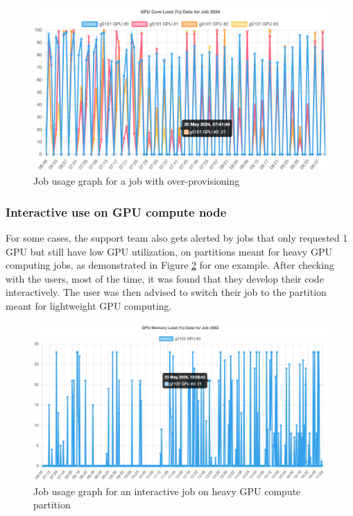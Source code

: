 \begin{figure}[H]
    \centering
    \includegraphics[width=1\textwidth]{figures/job-over-provison.png}
    \caption{Job usage graph for a job with over-provisioning}
    \label{fig_job_over_provison}
\end{figure}

\subsubsection{Interactive use on GPU compute node}
For some cases, the support team also gets alerted by jobs that only requested 1 GPU but still have low GPU utilization, on partitions meant for heavy GPU computing jobs, as demonstrated in Figure \ref{fig_job_interactive} for one example. After checking with the users, most of the time, it was found that they develop their code interactively. The user was then advised to switch their job to the partition meant for lightweight GPU computing.

\begin{figure}[H]
    \centering
    \includegraphics[width=1\textwidth]{figures/job-interactive.png}
    \caption{Job usage graph for an interactive job on heavy GPU compute partition}
    \label{fig_job_interactive}
\end{figure}

